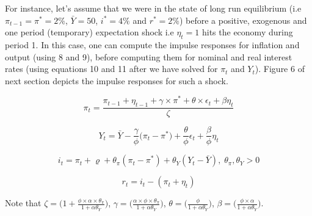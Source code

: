 \documentclass[12pt]{article}
\makeatletter
\newcommand\Taccount[3][3cm]%
{{\renewcommand\arraystretch{1.3}%
		\begin{adjustbox}{width=0.4\textwidth}
		\begin{tabular}[t]{@{}p{#1}|p{#1}@{}}
			\multicolumn{2}{@{}c@{}}{#2}\\
			\hline
			\hline
			#3
		\end{tabular}%
		\end{adjustbox}
	
}}
\newcommand{\1}{\mathbbm 1}
\renewcommand{\rho}{\varrho}
\makeatother
\begin{document}
For instance, let's assume that we were in the state of long run equilibrium (i.e $\pi_{t-1} = \pi^{*} = 2\%$, $\bar{Y} = 50$, $i^{*} = 4\%$ and $r^{*} = 2\%$) before a positive, exogenous and one period (temporary) expectation shock i.e $\eta_{t} = 1$ hits the economy during period 1. In this case, one can compute the impulse responses for inflation and output (using 8 and 9), before computing them for nominal and real interest rates (using equations 10 and 11 after we have solved for $\pi_{t}$ and $Y_{t}$). Figure 6 of next section depicts the impulse responses for such a shock. 



\begin{equation}
	\pi_{t}  = \frac{\pi_{t-1} + \eta_{t-1} + \gamma \times \pi^{*} + \theta \times \epsilon_{t} +  \beta \eta_{t}}{\zeta}
\end{equation}

\begin{equation}
	Y_{t}  = \bar{Y} - \frac{\gamma}{\phi} \bigg(\pi_{t} - \pi^{*}\bigg) + \frac{\theta}{\phi} \epsilon_{t} + \frac{\beta}{\phi} \eta_{t}
\end{equation}


	

\begin{equation}
	i_{t} = \pi_{t} + \rho + \theta_{\pi} (\pi_{t} - \pi^{*}) + \theta_{Y} (Y_{t} - \bar{Y}), \; \theta_{\pi}, \theta_{Y} > 0
\end{equation}

\begin{equation}
	r_{t} = i_{t} - (\pi_{t} + \eta_{t})
\end{equation}

Note that $\zeta = \bigg(1 +  \frac{\phi \times \alpha \times \theta_{\pi}}{1 + \alpha \theta_{Y}}\bigg)$, $\gamma = \bigg(\frac{\alpha \times \phi \times \theta_{\pi}}{1 + \alpha \theta_{Y}}\bigg)$, $\theta = \bigg(\frac{\phi}{1 + \alpha \theta_{Y}}\bigg)$, $\beta = \bigg(\frac{\phi \times \alpha}{1 + \alpha \theta_{Y}}\bigg)$.














	
\end{document}
